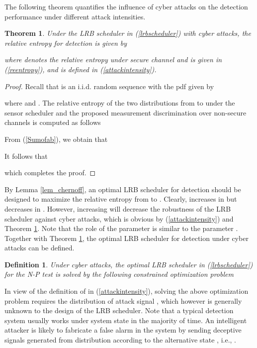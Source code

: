 \documentclass[journal]{IEEEtran}
\newtheorem{defi}{Definition}
\newtheorem{thm}{Theorem}
\begin{document}
The following theorem quantifies the influence of cyber attacks on the detection performance under different attack intensities.

\begin{thm}\label{thm_attack}
Under the LRB scheduler in (\ref{lrbscheduler}) with  cyber attacks, the relative entropy for detection is given by

where  denotes the relative entropy under secure channel and is given in (\ref{reentropy}), and  is defined in (\ref{attackintensity}).
\end{thm}
\begin{proof}
Recall that  is an i.i.d. random sequence with the pdf given by

where  and .
The relative entropy of the two distributions  from  to  under the sensor scheduler and  the proposed measurement discrimination over non-secure channels is computed as follows

From (\ref{Sumofab}), we obtain that

It follows that

which completes the proof.
\end{proof}

By Lemma \ref{lem_chernoff}, an optimal LRB scheduler for detection should be designed to maximize the relative entropy from  to . Clearly,   increases in  but decreases in . However, increasing  will decrease the robustness of the LRB scheduler against cyber attacks, which is obvious by (\ref{attackintensity}) and Theorem \ref{thm_attack}. Note that the role of the parameter  is similar to the parameter . Together with Theorem \ref{thm_attack}, the optimal LRB scheduler for detection under cyber attacks can be defined.

\begin{defi}
Under cyber attacks, the optimal LRB scheduler in (\ref{lrbscheduler}) for the N-P test is solved by the following constrained optimization problem

\end{defi}

In view of the definition of  in (\ref{attackintensity}), solving the above optimization problem requires the distribution of attack signal , which however is generally unknown to the design of the LRB scheduler. Note that a typical detection system usually works under system state  in the majority of time. An intelligent attacker is likely to fabricate a false alarm in the system by sending deceptive signals generated from distribution  according to the alternative state , i.e., .
\end{document}
